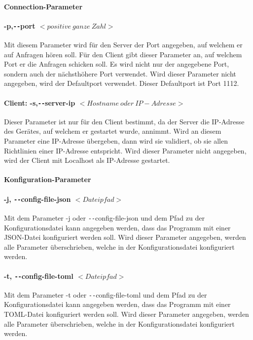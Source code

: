 \documentclass[a4paper,12pt,titlepage]{scrartcl}
\begin{document}
\paragraph{Connection-Parameter}

\paragraph{-p,\texttt{-{}-}port $<positive \: ganze \: Zahl>$}
Mit diesem Parameter wird für den Server der Port angegeben, auf welchem er auf Anfragen hören soll. Für den Client gibt dieser Parameter an, auf welchem Port er die Anfragen schicken soll. Es wird nicht nur der angegebene Port, sondern auch der nächsthöhere Port verwendet. Wird dieser Parameter nicht angegeben, wird der Defaultport verwendet. Dieser Defaultport ist Port 1112.

\paragraph{Client: -s,\texttt{-{}-}server-ip $<Hostname \: oder \: IP-Adresse>$}
Dieser Parameter ist nur für den Client bestimmt, da der Server die IP-Adresse des Gerätes, auf welchem er gestartet wurde, annimmt. Wird an diesem Parameter eine IP-Adresse übergeben, dann wird sie validiert, ob sie allen Richtlinien einer IP-Adresse entspricht. Wird dieser Parameter nicht angegeben, wird der Client mit Localhost als IP-Adresse gestartet.

\paragraph{Konfiguration-Parameter}

\paragraph{-j, \texttt{-{}-}config-file-json $<Dateipfad>$}
Mit dem Parameter -j oder \texttt{-{}-}config-file-json und dem Pfad zu der Konfigurationsdatei kann angegeben werden, dass das Programm mit einer JSON-Datei konfiguriert werden soll. Wird dieser Parameter angegeben, werden alle Parameter überschrieben, welche in der Konfigurationsdatei konfiguriert werden.

\paragraph{-t, \texttt{-{}-}config-file-toml $<Dateipfad>$}
Mit dem Parameter -t oder \texttt{-{}-}config-file-toml und dem Pfad zu der Konfigurationsdatei kann angegeben werden, dass das Programm mit einer TOML-Datei konfiguriert werden soll. Wird dieser Parameter angegeben, werden alle Parameter überschrieben, welche in der Konfigurationsdatei konfiguriert werden.
\end{document}
